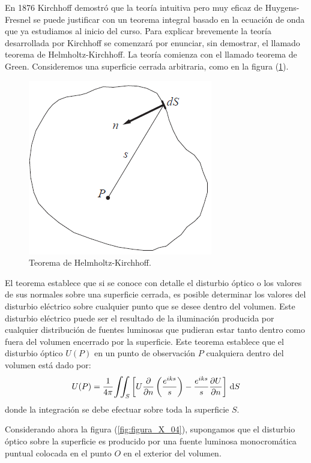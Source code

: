\documentclass[14pt]{extarticle}
\def\scaleiint#1{\vcenter{\hbox{\scaleto[6ex]{\displaystyle\iint}{#1}}}}
\def\bs{\mkern-12mu}
\begin{document}
En 1876 Kirchhoff demostró que la teoría intuitiva pero muy eficaz de Huygens-Fresnel se puede justificar con un teorema integral basado en la ecuación de onda que ya estudiamos al inicio del curso. Para explicar brevemente la teoría desarrollada por Kirchhoff se comenzará por enunciar, sin demostrar, el llamado teorema de Helmholtz-Kirchhoff. La teoría comienza con el llamado teorema de Green. Consideremos una superficie cerrada arbitraria, como en la figura (\ref{fig:figura_X_03}).
\begin{figure}[H]
    \centering
    \includegraphics[scale=1]{Imagenes/Difraccion_03.PNG}
    \caption{Teorema de Helmholtz-Kirchhoff.}
    \label{fig:figura_X_03}
\end{figure}
El teorema establece que si se conoce con detalle el disturbio óptico o los valores de sus normales sobre una superficie cerrada, es posible determinar los valores del disturbio eléctrico sobre cualquier punto que se desee dentro del volumen. Este disturbio eléctrico puede ser el resultado de la iluminación producida por cualquier distribución de fuentes luminosas que pudieran estar tanto dentro como fuera del volumen encerrado por la superficie. Este teorema establece que el disturbio óptico $U (P)$ en un punto de observación $P$ cualquiera dentro del volumen está dado por:
\begin{align}
U (P) = \dfrac{1}{4 \pi} \scaleiint{6ex}_{\bs S} \left[ U \pdv{n} \left( \dfrac{e^{i k s}}{s} \right) - \dfrac{e^{i k s}}{s} \pdv{U}{n} \right] \, \dd{S}
\label{eq:ecuacion_X_01}
\end{align}
donde la integración se debe efectuar sobre toda la superficie $S$.
\par
Considerando ahora la figura (\ref{fig:figura_X_04}), supongamos que el disturbio óptico sobre la superficie es producido por una fuente luminosa monocromática puntual colocada en el punto $O$ en el exterior del volumen.
\end{document}
